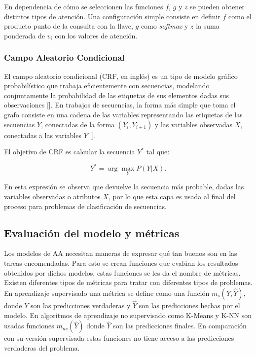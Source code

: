 En dependencia de cómo se seleccionen las funciones $f$, $g$ y $z$ se pueden obtener distintos tipos de atención.
Una configuración simple consiste en definir $f$ como el producto punto de la consulta con la llave,
$g$ como \emph{softmax} y $z$ la suma ponderada de $v_i$ con los valores de atención.

\subsubsection{Campo Aleatorio Condicional}


El campo aleatorio condicional (CRF, en inglés) es un 
tipo de modelo gráfico probabilístico que trabaja eficientemente con secuencias,
modelando conjuntamente la probabilidad de las etiquetas de sus elementos dadas sus observaciones [\cite{lafferty2001conditional}].
En trabajos de secuencias, la forma más simple que toma el grafo consiste en una cadena de las variables representando
las etiquetas de las secuencias $Y$, conectadas de la forma $(Y_i, Y_{i+1})$ y las variables observadas $X$, conectadas
a las variables $Y$ [\cite{wallach2004conditional}].

El objetivo de CRF es calcular la secuencia $Y^*$ tal que:

\begin{equation}
	Y^* = \arg \max_Y P(Y | X).
\end{equation}\label{eq:crf}

En esta expresión se observa que devuelve la secuencia más probable, dadas las variables observadas o atributos $X$,
por lo que esta capa es usada al final del proceso para problemas de clasificación de secuencias.

\subsection{Evaluación del modelo y métricas}

Los modelos de AA necesitan maneras de expresar qué tan buenos son 
en las tareas encomendadas. Para esto se crean funciones que evalúan los resultados obtenidos
por dichos modelos, estas funciones se les da el nombre de métricas. Existen diferentes tipos de
métricas para tratar con diferentes tipos de problemas. En aprendizaje supervisado una métrica se
define como una función $m_s(Y, \hat{Y})$, donde $Y$ son las predicciones verdaderas y $\hat{Y}$ son las predicciones
hechas por el modelo. En algoritmos de aprendizaje no supervisado como K-Means y K-NN son usadas funciones $m_{ns}(\hat{Y})$
donde $\hat{Y}$ son las predicciones finales. En comparación con su versión supervisada estas funciones no tiene acceso
a las predicciones verdaderas del problema.

